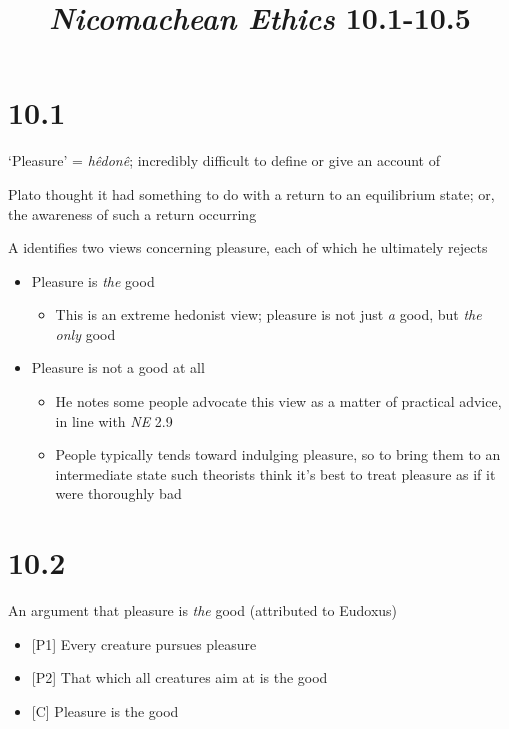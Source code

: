 \documentclass[11pt]{article}
\title{\emph{Nicomachean Ethics} 10.1-10.5}
\author{}
\date{}
\begin{document}
\maketitle

\section{10.1}

\noindent `Pleasure' = \emph{h\^{e}don\^{e}}; incredibly difficult to define or give an account of
\vspace*{2mm}

\noindent Plato thought it had something to do with a return to an equilibrium state; or, the awareness of such a return occurring
\vspace*{2mm}

\noindent A identifies two views concerning pleasure, each of which he ultimately rejects

\begin{itemize}\item{Pleasure is \emph{the} good}\begin{itemize}\item{This is an extreme hedonist view; pleasure is not just \emph{a} good, but \emph{the only} good}\end{itemize}\item{Pleasure is not a good at all}\begin{itemize}\item{He notes some people advocate this view as a matter of practical advice, in line with \emph{NE} 2.9}\item{People typically tends toward indulging pleasure, so to bring them to an intermediate state such theorists think it's best to treat pleasure as if it were thoroughly bad}\end{itemize}\end{itemize}

\section{10.2}

\noindent An argument that pleasure is \emph{the} good (attributed to Eudoxus)

\begin{itemize}\item{[P1] Every creature pursues pleasure}\item{[P2] That which all creatures aim at is the good}\item{[C] Pleasure is the good}\end{itemize}
\end{document}
